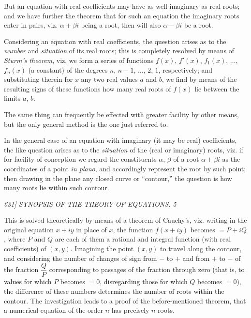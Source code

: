 \documentclass[12pt,a4paper]{article}
\begin{document}
But an equation with real coefficients may have as well imaginary as real roots; and we have further the theorem that for such an equation the imaginary roots enter in pairs, viz. $\alpha + \beta i$ being a root, then will also $\alpha - \beta i$ be a root.

Considering an equation with real coefficients, the question arises as to the \textit{number} and \textit{situation} of its real roots; this is completely resolved by means of \textit{Sturm's theorem}, viz. we form a series of functions $f(x)$, $f'(x)$, $f_1(x)$, $\ldots$, $f_n(x)$ (a constant) of the degrees $n$, $n-1$, $\ldots$, $2$, $1$, respectively; and substituting therein for $x$ any two real values $a$ and $b$, we find by means of the resulting signs of these functions how many real roots of $f(x)$ lie between the limits $a$, $b$.

The same thing can frequently be effected with greater facility by other means, but the only general method is the one just referred to.

In the general case of an equation with imaginary (it may be real) coefficients, the like question arises as to the \textit{situation} of the (real or imaginary) roots, viz. if for facility of conception we regard the constituents $\alpha$, $\beta$ of a root $\alpha + \beta i$ as the coordinates of a point \textit{in plano}, and accordingly represent the root by such point; then drawing in the plane any closed curve or ``contour,'' the question is how many roots lie within such contour.

\clearpage
\setcounter{page}{5}

\begin{center}
\textit{631] \hfill SYNOPSIS OF THE THEORY OF EQUATIONS. \hfill 5}
\end{center}

This is solved theoretically by means of a theorem of Cauchy's, viz. writing in the original equation $x + iy$ in place of $x$, the function $f(x+iy)$ becomes $= P + iQ$, where $P$ and $Q$ are each of them a rational and integral function (with real coefficients) of $(x, y)$. Imagining the point $(x, y)$ to travel along the contour, and considering the number of changes of sign from $-$ to $+$ and from $+$ to $-$ of the fraction $\dfrac{Q}{P}$ corresponding to passages of the fraction through zero (that is, to values for which $P$ becomes $=0$, disregarding those for which $Q$ becomes $=0$), the difference of these numbers determines the number of roots within the contour. The investigation leads to a proof of the before-mentioned theorem, that a numerical equation of the order $n$ has precisely $n$ roots.
\end{document}
